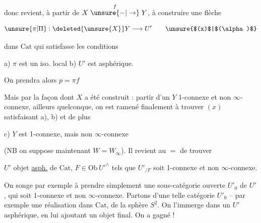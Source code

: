 
donc  revient, à partir de  $X\mathrel{\overset{f}{\unsure{-|\to}}}Y$, à construire une flèche

\[
\unsure{\pi|\Pi}:\deleted{\unsure{X}}Y\longrightarrow U'\tag*{\unsure{$(x)$|$(\alpha)$}}
\]

dans $\mathrm{Cat}$ qui satisfasse les conditions

a) $\pi$ est un iso. local \qquad b) $U'$ est asphérique.

On prendra alors $p=\pi f$

Mais par la façon dont $X$ a été construit : partir d'un $Y$ 1-connexe et non $\infty$-connexe,   ailleurs quelconque, on est ramené finalement à trouver $(x)$ satisfaisant a), b) et de plus

c) $Y$ est 1-connexe, mais non $\infty$-connexe

(NB on suppose maintenant $W=W_\infty$). Il revient au $=$ de trouver

\noindent\makebox[0pt][r]{\rule[-1.8\baselineskip]{0.45pt}{2.6\baselineskip}\hspace{.65em}}%
$U'$ objet \uline{asph.} de $\mathrm{Cat}$, $F\in\mathrm{Ob}\,{U'}^\wedge$ tels que $U'_{/F}$ soit 1-connexe et non $\infty$-connexe.

On songe par exemple à prendre simplement une sous-catégorie ouverte $U'_0$ de $U'$, qui soit 1-connexe et non $\infty$-connexe. Partons d'une telle catégorie $U'_0$ -- par exemple une réalisation  dans $\mathrm{Cat}$, de la sphère $S^2$. On l'immerge  dans un $U'$ asphérique, en lui ajoutant un objet final. On a gagné !
